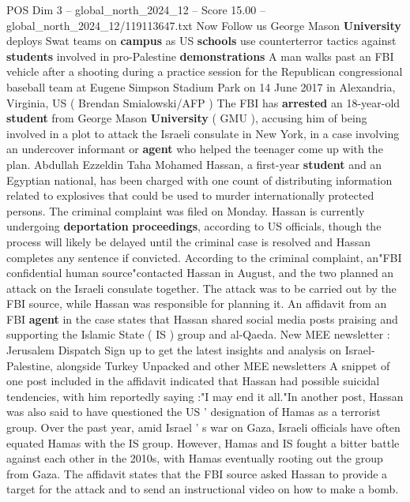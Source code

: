 \begin{textsample}{POS Dim 3 – global\_north\_2024\_12 – Score 15.00 – global\_north\_2024\_12/119113647.txt}  \label{ex:f3_pos_215}
Now Follow us George Mason \textbf{University} deploys Swat teams on \textbf{campus} as US \textbf{schools} use counterterror tactics against \textbf{students} involved in pro-Palestine \textbf{demonstrations} A man walks past an FBI vehicle after a shooting during a practice session for the Republican congressional baseball team at Eugene Simpson Stadium Park on 14 June 2017 in Alexandria, Virginia, US ( Brendan Smialowski/AFP ) The FBI has \textbf{arrested} an 18-year-old \textbf{student} from George Mason \textbf{University} ( GMU ), accusing him of being involved in a plot to attack the Israeli consulate in New York, in a case involving an undercover informant or \textbf{agent} who helped the teenager come up with the plan.
Abdullah Ezzeldin Taha Mohamed Hassan, a first-year \textbf{student} and an Egyptian national, has been charged with one count of distributing information related to explosives that could be used to murder internationally protected persons.
The criminal complaint was filed on Monday.
Hassan is currently undergoing \textbf{deportation} \textbf{proceedings}, according to US officials, though the process will likely be delayed until the criminal case is resolved and Hassan completes any sentence if convicted.
According to the criminal complaint, an"FBI confidential human source"contacted Hassan in August, and the two planned an attack on the Israeli consulate together.
The attack was to be carried out by the FBI source, while Hassan was responsible for planning it.
An affidavit from an FBI \textbf{agent} in the case states that Hassan shared social media posts praising and supporting the Islamic State ( IS ) group and al-Qaeda.
New MEE newsletter : Jerusalem Dispatch Sign up to get the latest insights and analysis on Israel-Palestine, alongside Turkey Unpacked and other MEE newsletters A snippet of one post included in the affidavit indicated that Hassan had possible suicidal tendencies, with him reportedly saying :"I may end it all."In another post, Hassan was also said to have questioned the US ' designation of Hamas as a terrorist group.
Over the past year, amid Israel ' s war on Gaza, Israeli officials have often equated Hamas with the IS group.
However, Hamas and IS fought a bitter battle against each other in the 2010s, with Hamas eventually rooting out the group from Gaza.
The affidavit states that the FBI source asked Hassan to provide a target for the attack and to send an instructional video on how to make a bomb.

\end{textsample}
